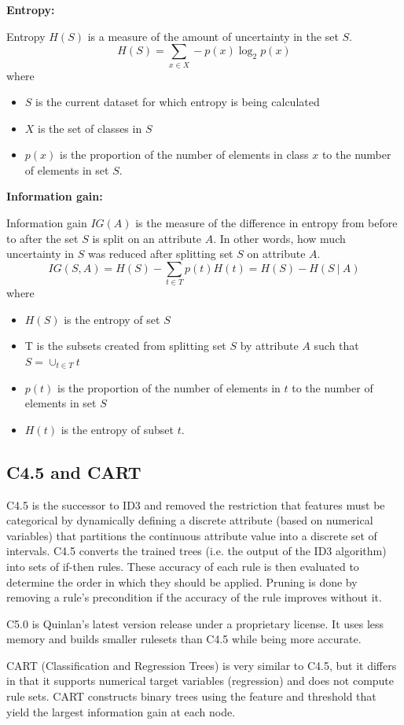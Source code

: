 \documentclass[a4paper, 11pt]{article}
\begin{document}
\textbf{Entropy:}

Entropy $H(S)$ is a measure of the amount of uncertainty in the set $S$.
$$H(S)=\sum_{x\in X}-p(x)\log_2p(x)$$
where
\begin{itemize}
	\item $S$ is the current dataset for which entropy is being calculated
	\item $X$ is the set of classes in $S$
	\item $p(x)$ is the proportion of the number of elements in class $x$ to the number of elements in set $S$.
\end{itemize}

\textbf{Information gain:}

Information gain $IG(A)$ is the measure of the difference in entropy from before to after the set $S$ is split on an attribute $A$. In other words, how much uncertainty in $S$ was reduced after splitting set $S$ on attribute $A$.
$$IG(S,A)=H(S)-\sum_{t\in T}p(t)H(t)=H(S)-H(S\ |\ A)$$
where
\begin{itemize}
	\item $H(S)$ is the entropy of set $S$
	\item T is the subsets created from splitting set $S$ by attribute $A$ such that $S=\cup_{t\in T}t$
	\item $p(t)$ is the proportion of the number of elements in $t$ to the number of elements in set $S$
	\item $H(t)$ is the entropy of subset $t$.
\end{itemize}
\subsection{C4.5 and CART}
C4.5 is the successor to ID3 and removed the restriction that features must be categorical by dynamically defining a discrete attribute (based on numerical variables) that partitions the continuous attribute value into a discrete set of intervals. C4.5 converts the trained trees (i.e. the output of the ID3 algorithm) into sets of if-then rules. These accuracy of each rule is then evaluated to determine the order in which they should be applied. Pruning is done by removing a rule’s precondition if the accuracy of the rule improves without it.

C5.0 is Quinlan’s latest version release under a proprietary license. It uses less memory and builds smaller rulesets than C4.5 while being more accurate.

CART (Classification and Regression Trees) is very similar to C4.5, but it differs in that it supports numerical target variables (regression) and does not compute rule sets. CART constructs binary trees using the feature and threshold that yield the largest information gain at each node.
\end{document}
